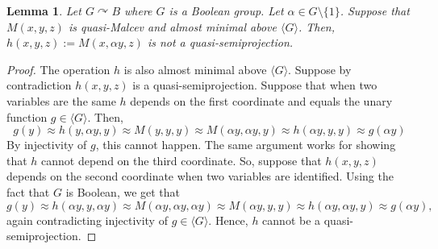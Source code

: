 \documentclass{article}
\newcommand{\ignore}[1]{}
\newtheorem{lemma}[theorem]{Lemma}
\theoremstyle{remark}
\theoremstyle{definition}
\def\acts{\curvearrowright}
\begin{document}
\ignore{
\begin{proof} Suppose by contradiction that $m$ is a quasi-majority almost minimal above $\overline{\langle G\rangle}$. Since $|G|>2$, take $\alpha, \beta\in G\setminus \{1\}$ distinct. Since $\alpha$ and $\beta$ are distinct and the action of $G$ is faithful, there is $a\in B$ such that $\alpha a=b\neq c=\beta a$. Let $h(x,y,z)=m(x,\alpha y, z)$ and $l(x,y,z)=m(x,z,\beta y)$.\\

From Lemma~\ref{majtoMal}, we can deduce that
\begin{equation}\label{fun1}
    m(x,\alpha x, y)\approx m(y,y,y)
\end{equation}
 since
\[  m(x,\alpha x, y)\approx h(x,x,y)\approx h(y,y,y)\approx m(y,y,y).\]
We can also deduce that \begin{equation}\label{fun2}
    m(x, z, \beta x)\approx m(z,z,z)
\end{equation}
from Remark~\ref{alsol} since
\[m(x,z,\beta x)\approx l(x,x,z)\approx l(z,z,z)\approx m(z,z,z).\]

Consider $a,b,c$ as above. We have that
\[m(c,c,c)=m(a, \alpha a, c)= m(a,b,c)= m(a, b, \beta a)=m(b,b,b),\]
where the first identity holds by~\ref{fun1} and the last by~\ref{fun2}. However, since $b\neq c$, this contradicts injectivity of $m(x,x,x)$ and thus almost minimality of $m$.
\end{proof}
}



\begin{lemma}\label{Malnoproj} Let $G\acts B$ where $G$ is a Boolean group.  
Let $\alpha\in G\setminus\{1\}$. Suppose that $M(x,y,z)$ is quasi-Malcev and almost minimal above ${\langle G \rangle}$. Then,  $h(x,y,z):=M(x,\alpha y, z)$ is not a quasi-semiprojection. 
\end{lemma}

\begin{proof} The operation $h$ is also almost minimal above ${\langle G\rangle}$. Suppose by contradiction $h(x,y,z)$ is a quasi-semiprojection. Suppose that when two variables are the same $h$ depends on the first coordinate and equals the unary function $g\in{\langle G \rangle}$. Then, 
\[g(y)\approx h(y, \alpha y, y)\approx M(y,y,y)\approx M(\alpha y, \alpha y, y)\approx h(\alpha y, y, y)\approx g(\alpha y)\]
By injectivity of $g$, this cannot happen. The same argument works for showing that $h$ cannot depend on the third coordinate. So, suppose that $h(x,y,z)$ depends on the second coordinate when two variables are identified. Using the fact that $G$ is Boolean, 
we get that 
\[g(y)\approx h(\alpha y, y, \alpha y)\approx M(\alpha y, \alpha y, \alpha y)\approx M(\alpha y, y, y)\approx h(\alpha y, \alpha y, y)\approx g(\alpha y),\]
again contradicting injectivity of $g\in{\langle G\rangle}$. Hence, $h$ cannot be a quasi-semiprojection.


\end{proof}
\end{document}
